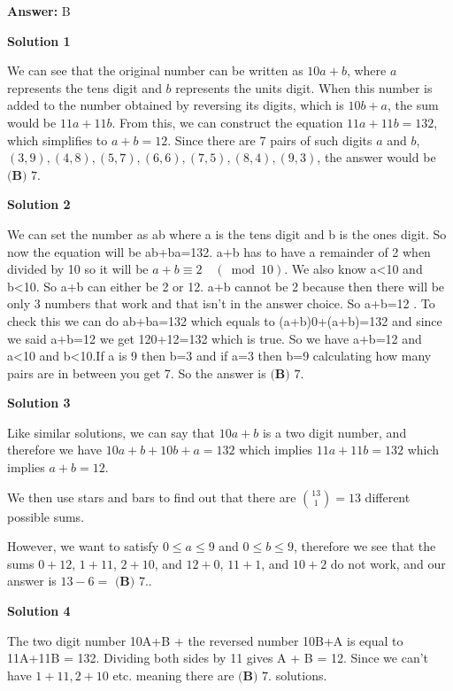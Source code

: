 \begin{enumerate}
 \textbf{Answer: }B



\textbf{Solution 1}

We can see that the original number can be written as $10a+b$, where $a$ represents the tens digit and $b$ represents the units digit. When this number is added to the number obtained by reversing its digits, which is $10b+a$, the sum would be $11a+11b$. From this, we can construct the equation $11a+11b=132$, which simplifies to $a+b=12$. Since there are 7 pairs of such digits $a$ and $b$, $(3,9), (4,8), (5,7), (6,6), (7,5), (8,4), (9,3)$, the answer would be $\boxed{\textbf{(B) } 7}.$




\textbf{Solution 2}

We can set the number as ab where a is the tens digit and b is the ones digit. So now the equation will be ab+ba=132. a+b has to have a remainder of 2 when divided by 10 so it will be \(a+b\equiv 2\quad (\bmod 10)\). We also know a<10 and b<10. So a+b can either be 2 or 12. a+b cannot be 2 because then there will be only 3 numbers that work and that isn't in the answer choice. So a+b=12 . To check this we can do ab+ba=132 which equals to (a+b)0+(a+b)=132 and since we said a+b=12 we get 120+12=132 which is true. So we have a+b=12 and a<10 and b<10.If a is 9 then b=3 and if a=3 then b=9 calculating how many pairs are in between you get 7. So the answer is $\boxed{\textbf{(B) } 7}.$




\textbf{Solution 3}

Like similar solutions, we can say that \( 10a+b \) is a two digit number, and therefore we have \( 10a+b + 10b+a = 132 \) which implies \( 11a + 11b = 132 \) which implies \( a + b = 12 \).

 We then use stars and bars to find out that there are \( \binom{13}{1} = 13 \) different possible sums.

 However, we want to satisfy \( 0 \le a \le 9 \) and \( 0 \le b \le 9 \), therefore we see that the sums \( 0+12 \), \( 1+11 \), \( 2+10 \), and \( 12+0 \), \( 11+1 \), and \( 10+2 \) do not work, and our answer is \( 13-6= \) $\boxed{\textbf{(B) } 7}.$.

 



\textbf{Solution 4}

The two digit number 10A+B + the reversed number 10B+A is equal to 11A+11B = 132. Dividing both sides by 11 gives A + B = 12. Since we can't have $1 + 11, 2 + 10$ etc. meaning there are $\boxed{\textbf{(B) } 7}.$ solutions.


\end{enumerate}
